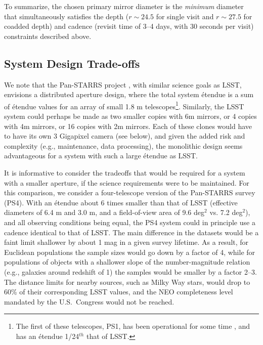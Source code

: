 To summarize, the chosen primary mirror diameter is the \textit{minimum}
diameter that simultaneously satisfies the depth ($r\sim24.5$ for single visit and
$r\sim27.5$ for coadded depth) and cadence (revisit time of 3--4 days,
with 30 seconds per visit) constraints described above.

\subsection{System Design Trade-offs}

We note that the Pan-STARRS project \citep{2002SPIE.4836..154K,2010SPIE.7733E..0EK}, with similar science
goals as LSST, envisions a distributed aperture design, where the total
system \'etendue is
a sum of \'etendue values for an array of small 1.8 m telescopes\footnote{The
first of these telescopes, PS1, has been operational for some time \citep{2016arXiv161205560C}, and
has an \'etendue 1/24$^{th}$ that of LSST. }.
Similarly, the LSST system could perhaps be made as two smaller copies with
6m mirrors, or 4 copies with 4m mirrors, or 16 copies with 2m mirrors. Each
of these clones would have to have its own 3 Gigapixel camera (see below), and
given the added risk and complexity (e.g., maintenance, data processing), the monolithic
design seems advantageous for a system with such a large \'etendue as LSST.

It is informative to consider the tradeoffs that would be required
for a system with a smaller aperture, if the science requirements were
to be maintained. For this comparison, we consider a four-telescope version of
the Pan-STARRS survey (PS4). With an \'etendue about 6 times smaller
than that of LSST (effective diameters of 6.4 m and 3.0 m, and a field-of-view area
of 9.6 deg$^2$ vs. 7.2 deg$^2$), and all observing conditions being equal,
the PS4 system could in principle use a cadence identical to that of LSST. The
main difference in the datasets would be a faint limit shallower by about
1 mag in a given survey lifetime. As a result, for Euclidean populations the
sample sizes would go down by a factor of 4, while for populations of
objects with a shallower slope of the number-magnitude relation (e.g.,
galaxies around redshift of 1) the samples would be smaller by a factor 2--3.
The distance limits for nearby sources, such as Milky Way stars, would drop to
60\% of their corresponding LSST values, and the NEO completeness level mandated by
the U.S.\ Congress would not be reached.


